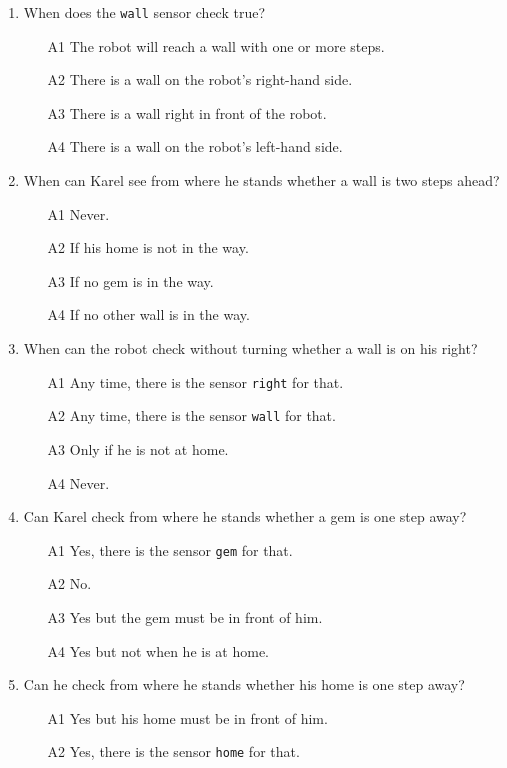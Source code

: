 \begin{enumerate}
\item When does the {\tt wall} sensor check true?
\begin{enumerate}
\item[A1] The robot will reach a wall with one or more steps. 
\item[A2] There is a wall on the robot's right-hand side.
\item[A3] There is a wall right in front of the robot.
\item[A4] There is a wall on the robot's left-hand side.
\end{enumerate}
\item When can Karel see from where he stands whether a wall is two steps ahead?
\begin{enumerate}
\item[A1] Never.
\item[A2] If his home is not in the way.
\item[A3] If no gem is in the way.
\item[A4] If no other wall is in the way.
\end{enumerate}
\item When can the robot check without turning whether a wall is on his right?
\begin{enumerate}
\item[A1] Any time, there is the sensor {\tt right} for that.
\item[A2] Any time, there is the sensor {\tt wall} for that.
\item[A3] Only if he is not at home.
\item[A4] Never.
\end{enumerate}
\item Can Karel check from where he stands whether a gem is one step away?
\begin{enumerate}
\item[A1] Yes, there is the sensor {\tt gem} for that.
\item[A2] No.
\item[A3] Yes but the gem must be in front of him.
\item[A4] Yes but not when he is at home.
\end{enumerate}
\item Can he check from where he stands whether his home is one step away?
\begin{enumerate}
\item[A1] Yes but his home must be in front of him.
\item[A2] Yes, there is the sensor {\tt home} for that.

\end{enumerate}
\end{enumerate}
